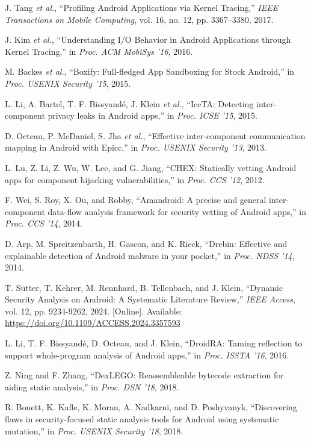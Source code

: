 \documentclass[a4paper,12pt]{report}
\begin{document}
\begin{thebibliography}{99}
J. Tang \emph{et al.}, “Profiling Android Applications via Kernel Tracing,” \emph{IEEE Transactions on Mobile Computing}, vol. 16, no. 12, pp. 3367–3380, 2017.

J. Kim \emph{et al.}, “Understanding I/O Behavior in Android Applications through Kernel Tracing,” in \emph{Proc. ACM MobiSys '16}, 2016.

M. Backes \emph{et al.}, “Boxify: Full-fledged App Sandboxing for Stock Android,” in \emph{Proc. USENIX Security '15}, 2015.

L. Li, A. Bartel, T. F. Bissyandé, J. Klein \emph{et al.}, “IccTA: Detecting inter-component privacy leaks in Android apps,” in \emph{Proc. ICSE ’15}, 2015.

D. Octeau, P. McDaniel, S. Jha \emph{et al.}, “Effective inter-component communication mapping in Android with Epicc,” in \emph{Proc. USENIX Security '13}, 2013.

L. Lu, Z. Li, Z. Wu, W. Lee, and G. Jiang, “CHEX: Statically vetting Android apps for component hijacking vulnerabilities,” in \emph{Proc. CCS '12}, 2012.

F. Wei, S. Roy, X. Ou, and Robby, “Amandroid: A precise and general inter-component data-flow analysis framework for security vetting of Android apps,” in \emph{Proc. CCS '14}, 2014.

D. Arp, M. Spreitzenbarth, H. Gascon, and K. Rieck, “Drebin: Effective and explainable detection of Android malware in your pocket,” in \emph{Proc. NDSS '14}, 2014.

T. Sutter, T. Kehrer, M. Rennhard, B. Tellenbach, and J. Klein, “Dynamic Security Analysis on Android: A Systematic Literature Review,” \emph{IEEE Access}, vol. 12, pp. 9234-9262, 2024. [Online]. Available: \url{https://doi.org/10.1109/ACCESS.2024.3357593}

L. Li, T. F. Bissyandé, D. Octeau, and J. Klein, “DroidRA: Taming reflection to support whole-program analysis of Android apps,” in \emph{Proc. ISSTA '16}, 2016.

Z. Ning and F. Zhang, “DexLEGO: Reassembleable bytecode extraction for aiding static analysis,” in \emph{Proc. DSN '18}, 2018.

R. Bonett, K. Kafle, K. Moran, A. Nadkarni, and D. Poshyvanyk, “Discovering flaws in security-focused static analysis tools for Android using systematic mutation,” in \emph{Proc. USENIX Security '18}, 2018.


\end{thebibliography}
\end{document}

